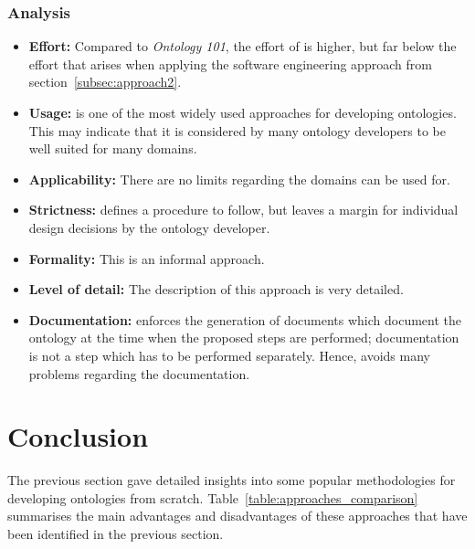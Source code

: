 \subsubsection{Analysis}

\begin{itemize}
  \item \textbf{Effort:} Compared to \emph{Ontology 101}, the effort of \methontology is higher, but far below the effort that arises when applying the software engineering approach from section~\ref{subsec:approach2}.
  
  \item \textbf{Usage:} \methontology is one of the most widely used approaches for developing ontologies. This may indicate that it is considered by many ontology developers to be well suited for many domains.
  
  \item \textbf{Applicability:} There are no limits regarding the domains \methontology can be used for.
  
  \item \textbf{Strictness:} \methontology defines a procedure to follow, but leaves a margin for individual design decisions by the ontology developer.
  
  \item \textbf{Formality:} This is an informal approach.
  
  \item \textbf{Level of detail:} The description of this approach is very detailed.
  
  \item \textbf{Documentation:} \methontology enforces the generation of documents which document the ontology at the time when the proposed steps are performed; documentation is not a step which has to be performed separately. Hence, \methontology avoids many problems regarding the documentation.
\end{itemize}

\section{Conclusion}
\label{sec:approaches_conclusion}

The previous section gave detailed insights into some popular methodologies for developing ontologies from scratch. Table~\ref{table:approaches_comparison} summarises the main advantages and disadvantages of these approaches that have been identified in the previous section.

